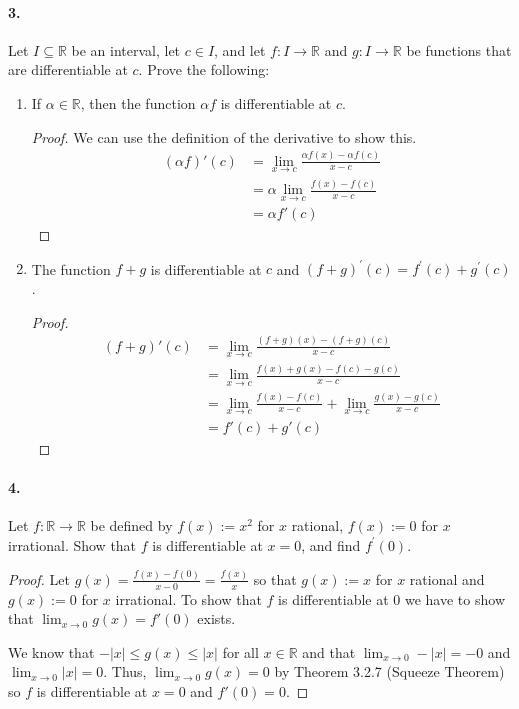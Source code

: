 \documentclass[12pt]{article}
\theoremstyle{remark}
\begin{document}
\paragraph{3.} Let $I \subseteq \mathbb{R}$ be an interval, let $c \in I$, and let $f: I \rightarrow \mathbb{R}$ and $g: I \rightarrow \mathbb{R}$ be functions that are differentiable at $c$. Prove the following:
\begin{enumerate}[label=(\alph*)]
    \item If $\alpha \in \mathbb{R}$, then the function $\alpha f$ is differentiable at $c$.
    \begin{proof}
        We can use the definition of the derivative to show this.
        \begin{align*}
            (\alpha f)'(c) &= \lim_{x \to c} \frac{\alpha f(x) - \alpha f(c)}{x - c} \\
            &= \alpha \lim_{x \to c} \frac{f(x) - f(c)}{x - c} \\
            &= \alpha f'(c)
        \end{align*}
    \end{proof}

    \item The function $f + g$ is differentiable at $c$ and $(f + g)^{\prime}(c) = f^{\prime}(c) + g^{\prime}(c)$.
    \begin{proof}
        \begin{align*}
            (f + g)'(c) &= \lim_{x \to c} \frac{(f + g)(x) - (f + g)(c)}{x - c} \\
            &= \lim_{x \to c} \frac{f(x) + g(x) - f(c) - g(c)}{x - c} \\
            &= \lim_{x \to c} \frac{f(x) - f(c)}{x - c} + \lim_{x \to c} \frac{g(x) - g(c)}{x - c} \\
            &= f'(c) + g'(c)
        \end{align*}
    \end{proof}
\end{enumerate}

\paragraph{4.} Let $f: \mathbb{R} \rightarrow \mathbb{R}$ be defined by $f(x):=x^2$ for $x$ rational, $f(x):=0$ for $x$ irrational. Show that $f$ is differentiable at $x=0$, and find $f^{\prime}(0)$.
\begin{proof}
    Let $g(x) = \frac{f(x) - f(0)}{x - 0} = \frac{f(x)}{x}$ so that $g(x) := x$ for $x$ rational and $g(x) := 0$ for $x$ irrational. To show that $f$ is differentiable at 0 we have to show that $\lim_{x \to 0} g(x) = f'(0)$ exists. 
    
    We know that $-|x| \leq g(x) \leq |x|$ for all $x \in \mathbb{R}$ and that $\lim_{x \to 0} -|x| = -0$ and $\lim_{x \to 0} |x| = 0$. Thus, $\lim_{x \to 0} g(x) = 0$ by Theorem 3.2.7 (Squeeze Theorem) so $f$ is differentiable at $x = 0$ and $f'(0) = 0$.
\end{proof}
\pagebreak
\end{document}
